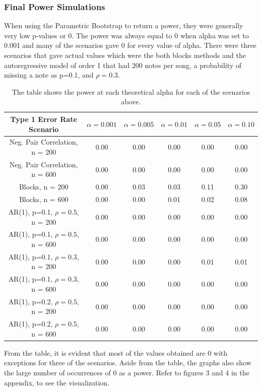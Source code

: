 \documentclass[12pt, letterpaper]{article}
\begin{document}
\subsubsection{Final Power Simulations}
When using the Parametric Bootstrap to return a power, they were generally very low p-values or 0.  The power was always equal to 0 when alpha was set to 0.001 and many of the scenarios gave 0 for every value of alpha.  There were three scenarios that gave actual values which were the both blocks methods and the autoregressive model of order 1 that had 200 notes per song, a probability of missing a note as p=0.1, and $\rho = 0.3$. 
\begin{table}[t]
\begin{center}
\begin{tabular}{|c|c|c|c|c|c|}
\hline
\textbf{Type 1 Error Rate Scenario} & $\alpha = 0.001$ &  $\alpha = 0.005$ &  $\alpha = 0.01$ &  $\alpha = 0.05$ &  $\alpha = 0.10$ \\
\hline
Neg. Pair Correlation, n = 200 & 0.00 & 0.00 & 0.00 & 0.00 & 0.00 \\
\hline
Neg. Pair Correlation, n = 600 & 0.00 & 0.00 & 0.00 & 0.00 & 0.00 \\
\hline
Blocks, n = 200 & 0.00 & 0.03 & 0.03 & 0.11 & 0.30 \\
\hline
Blocks, n = 600 & 0.00 & 0.00 & 0.01 & 0.02 & 0.08 \\
\hline
AR(1), p=0.1, $\rho = 0.5$, n = 200 & 0.00 & 0.00 & 0.00 & 0.00 & 0.00 \\
\hline
AR(1), p=0.1, $\rho = 0.5$, n = 600 & 0.00 & 0.00 & 0.00 & 0.00 & 0.00 \\
\hline
AR(1), p=0.1, $\rho = 0.3$, n = 200 & 0.00 & 0.00 & 0.00 & 0.01 & 0.01 \\
\hline
AR(1), p=0.1, $\rho = 0.3$, n = 600 & 0.00 & 0.00 & 0.00 & 0.00 & 0.00 \\
\hline
AR(1), p=0.2, $\rho = 0.5$, n = 200 & 0.00 & 0.00 & 0.00 & 0.00 & 0.00 \\
\hline
AR(1), p=0.2, $\rho = 0.5$, n = 600 & 0.00 & 0.00 & 0.00 & 0.00 & 0.00 \\
\hline
\end{tabular} 
\end{center}
\caption{The table shows the power at each theoretical alpha for each of the scenarios above.}
\label{fig: Power Simulations using Parametric Bootstrap}
\end{table}
From the table, it is evident that most of the values obtained are 0 with exceptions for three of the scenarios.  Aside from the table, the graphs also show the large number of occurrences of 0 as a power. Refer to figures 3 and 4 in the appendix, to see the visualization.
\end{document}
